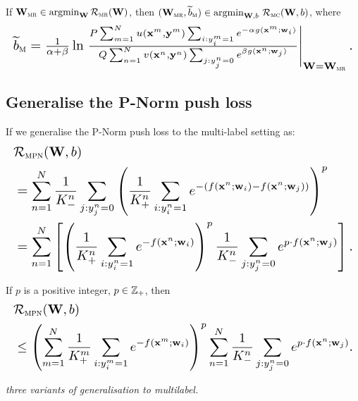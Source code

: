 \begin{theorem}
\label{theorem:mr2mc}
If $\mathbf{W}_\textsc{mr} \in \operatorname*{argmin}_{\mathbf{W}} \mathcal{R}_\textsc{mr}(\mathbf{W})$,
then $(\mathbf{W}_\textsc{mr}, \widetilde{b}_\textsc{m}) \in \operatorname*{argmin}_{\mathbf{W},b} \, \mathcal{R}_\textsc{mc}(\mathbf{W}, b)$, 
where
$$
\resizebox{\linewidth}{!}{$
\bt_\textsc{m} = \frac{1}{\alpha + \beta} \ln \left.
      \frac{P \sum_{m=1}^N u(\x^m, \y^m) \sum_{i: y_i^m = 1} e^{-\alpha g(\x^m; \w_i)}}
           {Q \sum_{n=1}^N v(\x^n, \y^n) \sum_{j: y_j^n = 0} e^{ \beta  g(\x^n; \w_j)}} \right|_{\W = \W_\textsc{mr}}.
$}
$$
\end{theorem}


\subsection{Generalise the P-Norm push loss}

If we generalise the P-Norm push loss to the multi-label setting as:
\begin{equation*}
\resizebox{\linewidth}{!}{$
\begin{aligned}
&\RCal_\textsc{mpn}(\W, b) \\
&= \sum_{n=1}^N \frac{1}{K_-^n} \sum_{j:y_j^n=0} \left( \frac{1}{K_+^n} \sum_{i:y_i^n=1} e^{-(f(\x^n; \w_i) - f(\x^n; \w_j))} \right)^p \\
&= \sum_{n=1}^N \left[ \left( 
   \frac{1}{K_+^n} \sum_{i:y_i^n=1} e^{-f(\x^n; \w_i)} \right)^p 
   \frac{1}{K_-^n} \sum_{j:y_j^n=0} e^{p \cdot f(\x^n; \w_j)} \right].
\end{aligned}
$}
\end{equation*}


\begin{theorem}
\label{theorem:pnorm-ml-ub}
If $p$ is a positive integer, \ie $p \in \mathbb{Z}_+$, then 
\begin{equation*}
\resizebox{\linewidth}{!}{$
\begin{aligned}
&\RCal_\textsc{mpn}(\W, b) \\
&\le 
\left( \sum_{m=1}^N \frac{1}{K_+^m} \sum_{i:y_i^m=1} e^{-f(\x^m; \w_i)} \right)^p 
\sum_{n=1}^N \frac{1}{K_-^n} \sum_{j:y_j^n=0} e^{p \cdot f(\x^n; \w_j)}.
\end{aligned}
$}
\end{equation*}
\end{theorem}

\TODO
{\it three variants of generalisation to multilabel.}
